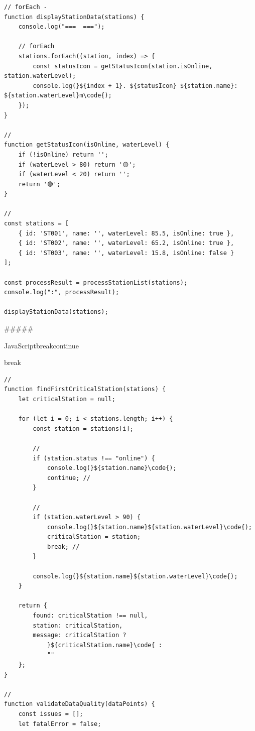 {\begin{lstlisting}[style=javascript]
// forEach - 
function displayStationData(stations) {
    console.log("===  ===");
    
    // forEach
    stations.forEach((station, index) => {
        const statusIcon = getStatusIcon(station.isOnline, station.waterLevel);
        console.log(}${index + 1}. ${statusIcon} ${station.name}: ${station.waterLevel}m\code{);
    });
}

// 
function getStatusIcon(isOnline, waterLevel) {
    if (!isOnline) return '';
    if (waterLevel > 80) return '🟡';
    if (waterLevel < 20) return '';
    return '🟢';
}

// 
const stations = [
    { id: 'ST001', name: '', waterLevel: 85.5, isOnline: true },
    { id: 'ST002', name: '', waterLevel: 65.2, isOnline: true },
    { id: 'ST003', name: '', waterLevel: 15.8, isOnline: false }
];

const processResult = processStationList(stations);
console.log(":", processResult);

displayStationData(stations);
\end{lstlisting}

##### 

JavaScriptbreakcontinue


break

\begin{lstlisting}[style=javascript]
// 
function findFirstCriticalStation(stations) {
    let criticalStation = null;
    
    for (let i = 0; i < stations.length; i++) {
        const station = stations[i];
        
        // 
        if (station.status !== "online") {
            console.log(}${station.name}\code{);
            continue; // 
        }
        
        // 
        if (station.waterLevel > 90) {
            console.log(}${station.name}${station.waterLevel}\code{);
            criticalStation = station;
            break; // 
        }
        
        console.log(}${station.name}${station.waterLevel}\code{);
    }
    
    return {
        found: criticalStation !== null,
        station: criticalStation,
        message: criticalStation ? 
            }${criticalStation.name}\code{ : 
            ""
    };
}

// 
function validateDataQuality(dataPoints) {
    const issues = [];
    let fatalError = false;
    

\end{lstlisting}}
